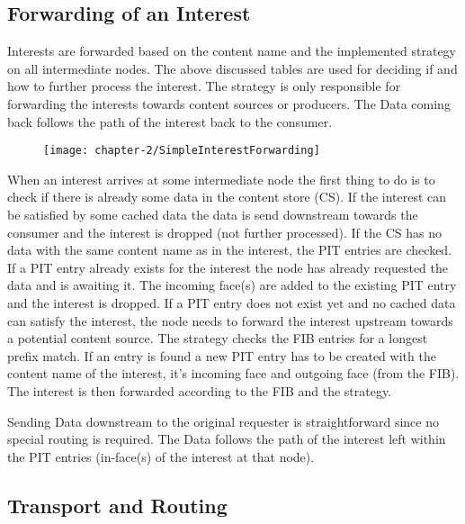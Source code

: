 \subsection{Forwarding of an Interest}

Interests are forwarded based on the content name and the implemented strategy on all intermediate nodes. The above discussed tables are used for deciding if and how to further process the interest. The strategy is only responsible for forwarding the interests towards content sources or producers. The Data coming back follows the path of the interest back to the consumer.

\begin{figure}[H]
\texttt{[image: chapter-2/SimpleInterestForwarding]}
\centering
\end{figure}

When an interest arrives at some intermediate node the first thing to do is to check if there is already some data in the content store (CS). If the interest can be satisfied by some cached data the data is send downstream towards the consumer and the interest is dropped (not further processed). If the CS has no data with the same content name as in the interest, the PIT entries are checked. If a PIT entry already exists for the interest the node has already requested the data and is awaiting it. The incoming face(s) are added to the existing PIT entry and the interest is dropped. If a PIT entry does not exist yet and no cached data can satisfy the interest, the node needs to forward the interest upstream towards a potential content source. The strategy checks the FIB entries for a longest prefix match. If an entry is found a new PIT entry has to be created with the content name of the interest, it's incoming face and outgoing face (from the FIB). The interest is then forwarded according to the FIB and the strategy.

\vspace{5mm} %

Sending Data downstream to the original requester is straightforward since no special routing is required. The Data follows the path of the interest left within the PIT entries (in-face(s) of the interest at that node). 

\subsection{Transport and Routing}

